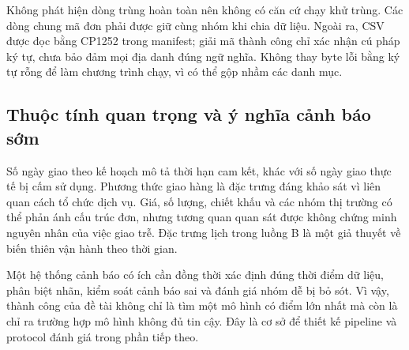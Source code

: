 Không phát hiện dòng trùng hoàn toàn nên không có căn cứ chạy khử trùng.
Các dòng chung mã đơn phải được giữ cùng nhóm khi chia dữ liệu. Ngoài ra,
CSV được đọc bằng CP1252 trong manifest; giải mã thành công chỉ xác nhận
cú pháp ký tự, chưa bảo đảm mọi địa danh đúng ngữ nghĩa. Không thay byte lỗi
bằng ký tự rỗng để làm chương trình chạy, vì có thể gộp nhầm các danh mục.

\subsection{Thuộc tính quan trọng và ý nghĩa cảnh báo sớm}
Số ngày giao theo kế hoạch mô tả thời hạn cam kết, khác với số ngày giao
thực tế bị cấm sử dụng. Phương thức giao hàng là đặc trưng đáng khảo sát vì
liên quan cách tổ chức dịch vụ. Giá, số lượng, chiết khấu và các nhóm thị
trường có thể phản ánh cấu trúc đơn, nhưng tương quan quan sát được không
chứng minh nguyên nhân của việc giao trễ. Đặc trưng lịch trong luồng B là
một giả thuyết về biến thiên vận hành theo thời gian.

Một hệ thống cảnh báo có ích cần đồng thời xác định đúng thời điểm dữ liệu,
phân biệt nhãn, kiểm soát cảnh báo sai và đánh giá nhóm dễ bị bỏ sót. Vì vậy,
thành công của đề tài không chỉ là tìm một mô hình có điểm lớn nhất mà còn
là chỉ ra trường hợp mô hình không đủ tin cậy. Đây là cơ sở để thiết kế
pipeline và protocol đánh giá trong phần tiếp theo.
